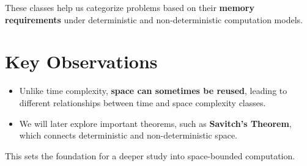 These classes help us categorize problems based on their \textbf{memory requirements} under deterministic and non-deterministic computation models.

\section{Key Observations}
\begin{itemize}
    \item Unlike time complexity, \textbf{space can sometimes be reused}, leading to different relationships between time and space complexity classes.
    \item We will later explore important theorems, such as \textbf{Savitch's Theorem}, which connects deterministic and non-deterministic space.
\end{itemize}

This sets the foundation for a deeper study into space-bounded computation.
